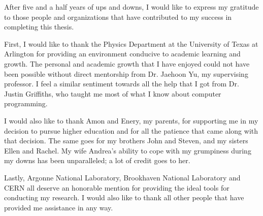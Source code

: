 \par After five and a half years of ups and downs, I would like to express my 
gratitude to those people and organizations that have contributed to my 
success in completing this thesis. 

\par First, I would like to thank the Physics Department at the University of 
Texas at Arlington for providing an environment conducive to academic learning and 
growth. The personal and academic growth that I have enjoyed could not have been 
possible without direct mentorship from Dr. Jaehoon Yu, my supervising professor. 
I feel a similar sentiment towards all the help that I got from Dr. Justin Griffiths, 
who taught me most of what I know about computer programming.  

\par I would also like to thank Amon and Enery, my parents, for supporting me in 
my decision to pursue higher education and for all the patience that came along with 
that decision. The same goes for my brothers John and Steven, and my sisters Ellen and 
Rachel. My wife Andrea's ability to cope with my grumpiness during my downs has 
been unparalleled; a lot of credit goes to her.

\par Lastly, Argonne National Laboratory, Brookhaven National Laboratory and CERN all 
deserve an honorable mention for providing the ideal tools for conducting my research.
I would also like to thank all other people that have provided me assistance in 
any way.    
